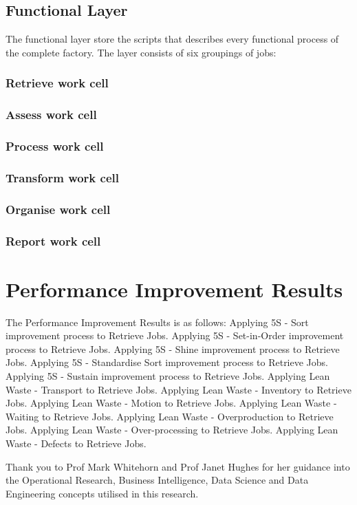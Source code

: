 \documentclass{sigplanconf}
\begin{document}
\subsection{Functional Layer}
The functional layer store the scripts that describes every functional process of the complete factory. The layer consists of six groupings of jobs:
\subsubsection{Retrieve work cell}

\subsubsection{Assess work cell}


\subsubsection{Process work cell}

\subsubsection{Transform work cell}

\subsubsection{Organise work cell}

\subsubsection{Report work cell}

\appendix
\section{Performance Improvement Results}
The Performance Improvement Results is as follows:
Applying 5S - Sort improvement process to Retrieve Jobs.
Applying 5S - Set-in-Order improvement process to Retrieve Jobs.
Applying 5S - Shine improvement process to Retrieve Jobs.
Applying 5S - Standardise Sort improvement process to Retrieve Jobs.
Applying 5S - Sustain improvement process to Retrieve Jobs.
Applying Lean Waste - Transport to Retrieve Jobs.
Applying Lean Waste - Inventory to Retrieve Jobs.
Applying Lean Waste - Motion to Retrieve Jobs.
Applying Lean Waste - Waiting to Retrieve Jobs.
Applying Lean Waste - Overproduction to Retrieve Jobs.
Applying Lean Waste - Over-processing to Retrieve Jobs.
Applying Lean Waste - Defects to Retrieve Jobs.

\acks

Thank you to Prof Mark Whitehorn and Prof Janet Hughes for her guidance into the Operational Research, Business Intelligence, Data Science and Data Engineering concepts utilised in this research.






\softraggedright
\end{document}
